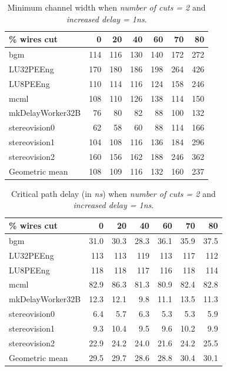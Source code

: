 \documentclass{sig-alternate-2013}
\begin{document}
\begin{table}[!htbp]
\begin{tabular}{|l|r|r|r|r|r|r|}
\hline
\% wires cut & 0 & 20 & 40 & 60 & 70 & 80 \\ \hline \hline
bgm & 114 & 116 & 130 & 140 & 172 & 272 \\ \hline
LU32PEEng & 170 & 180 & 186 & 198 & 264 & 426 \\ \hline
LU8PEEng & 110 & 114 & 116 & 124 & 158 & 246 \\ \hline
mcml & 108 & 110 & 126 & 138 & 114 & 150 \\ \hline
mkDelayWorker32B & 76 & 80 & 82 & 88 & 100 & 132 \\ \hline
stereovision0 & 62 & 58 & 60 & 88 & 114 & 166 \\ \hline
stereovision1 & 104 & 108 & 116 & 136 & 184 & 296 \\ \hline
stereovision2 & 160 & 156 & 162 & 188 & 246 & 362 \\ \hline
Geometric mean & 108 & 109 & 116 & 132 & 160 & 237 \\ \hline
\end{tabular}
\caption{Minimum channel width when \textit{number of cuts = 2} and \textit{increased delay = 1ns}.}
\label{table:2cut_minW}
\end{table}

\begin{table}[!htbp]
\begin{tabular}{|l|r|r|r|r|r|r|}
\hline
\% wires cut & 0 & 20 & 40 & 60 & 70 & 80 \\ \hline \hline
bgm & 31.0 & 30.3 & 28.3 & 36.1 & 35.9 & 37.5 \\ \hline
LU32PEEng & 113 & 113 & 119 & 113 & 117 & 112 \\ \hline
LU8PEEng & 118 & 118 & 117 & 116 & 118 & 114 \\ \hline
mcml & 82.9 & 86.3 & 81.3 & 80.9 & 82.4 & 82.8 \\ \hline
mkDelayWorker32B & 12.3 & 12.1 & 9.8 & 11.1 & 13.5 & 11.3 \\ \hline
stereovision0 & 6.4 & 5.7 & 6.3 & 5.3 & 5.3 & 5.9 \\ \hline
stereovision1 & 9.3 & 10.4 & 9.5 & 9.6 & 10.2 & 9.9 \\ \hline
stereovision2 & 22.9 & 24.2 & 24.0 & 21.6 & 24.2 & 25.5 \\ \hline
Geometric mean & 29.5 & 29.7 & 28.6 & 28.8 & 30.4 & 30.1 \\ \hline
\end{tabular}
\caption{Critical path delay (in \textit{ns}) when \textit{number of cuts = 2} and \textit{increased delay = 1ns}.}
\label{table:2cut_path}
\end{table}
\end{document}
